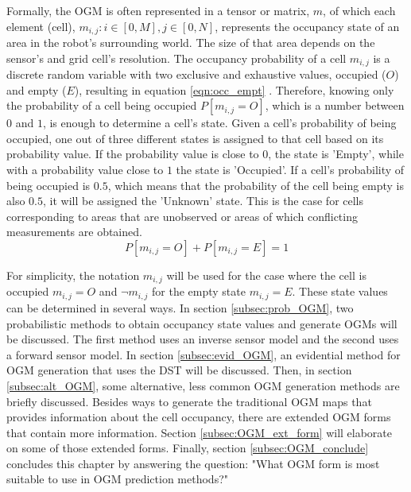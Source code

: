 Formally, the \gls{OGM} is often represented in a tensor or matrix, $m$, of which each element (cell), $m_{i,j}: i \in [0, M],j \in [0, N]$, represents the occupancy state of an area in the robot's surrounding world. The size of that area depends on the sensor's and grid cell's resolution. The occupancy probability of a cell $m_{i,j}$ is a discrete random variable with two exclusive and exhaustive values, occupied ($O$) and empty ($E$), resulting in equation \ref{eqn:occ_empt} \cite{elfes1989using}. Therefore, knowing only the probability of a cell being occupied $P[m_{i,j} = O]$, which is a number between $0$ and $1$, is enough to determine a cell's state. Given a cell's probability of being occupied, one out of three different states is assigned to that cell based on its probability value. If the probability value is close to $0$, the state is 'Empty', while with a probability value close to $1$ the state is 'Occupied'. If a cell's probability of being occupied is $0.5$, which means that the probability of the cell being empty is also $0.5$, it will be assigned the 'Unknown' state. This is the case for cells corresponding to areas that are unobserved or areas of which conflicting measurements are obtained. \\

\begin{equation} \label{eqn:occ_empt}
	P[m_{i,j} = O] + P[m_{i,j} = E] = 1
\end{equation} 

\hfill \break

For simplicity, the notation $m_{i,j}$ will be used for the case where the cell is occupied $m_{i,j} = O$ and $\neg m_{i,j}$ for the empty state $m_{i,j} = E$.
These state values can be determined in several ways. In section \ref{subsec:prob_OGM}, two probabilistic methods to obtain occupancy state values and generate \glspl{OGM} will be discussed. The first method uses an inverse sensor model and the second uses a forward sensor model. In section \ref{subsec:evid_OGM}, an evidential method for \gls{OGM} generation that uses the \gls{DST} will be discussed. Then, in section \ref{subsec:alt_OGM}, some alternative, less common \gls{OGM} generation methods are briefly discussed.
Besides ways to generate the traditional \gls{OGM} maps that provides information about the cell occupancy, there are extended \gls{OGM} forms that contain more information. Section \ref{subsec:OGM_ext_form} will elaborate on some of those extended forms. Finally, section \ref{subsec:OGM_conclude} concludes this chapter by answering the question: "What OGM form is most suitable to use in OGM prediction methods?"

